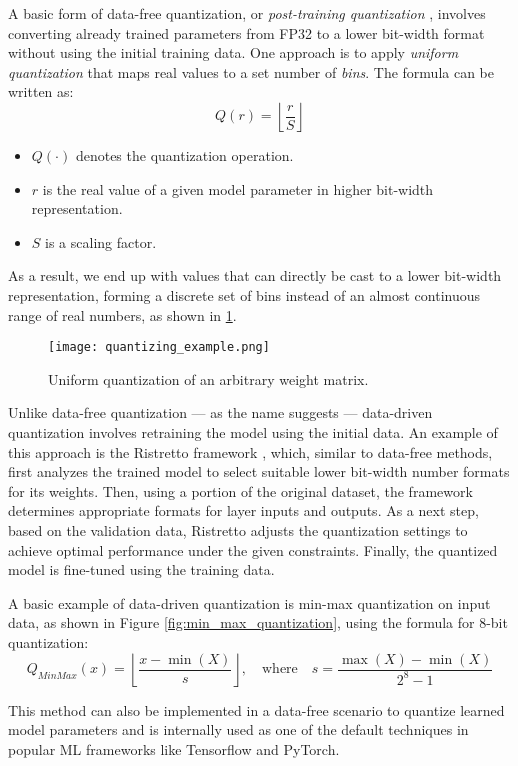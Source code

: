 A basic form of data-free quantization, or \textit{post-training quantization} \cite{jiang2021efficient},
involves converting already trained parameters from FP32 to a lower bit-width format
without using the initial training data. 
One approach is to apply \textit{uniform quantization} that maps real values to a set number
of \textit{bins}. The formula can be written as:
\[
Q(r) = \left\lfloor \frac{r}{S} \right\rfloor
\]

\newpage
\begin{itemize}
    \item $Q(\cdot)$ denotes the quantization operation.
    \item $r$ is the real value of a given model parameter in higher bit-width representation.
    \item $S$ is a scaling factor.
\end{itemize}
As a result, we end up with values that can directly be cast to a lower bit-width representation,
forming a discrete set of bins instead of an almost continuous range of real numbers,
as shown in \cref{fig:quantizing_example}.
\begin{figure}[b!]
  \centering
  \texttt{[image: quantizing\_example.png]}
  \caption{Uniform quantization of an arbitrary weight matrix.}
  \label{fig:quantizing_example}
\end{figure}

Unlike data-free quantization  —  as the name suggests — data-driven quantization involves retraining the model
using the initial data. An example of this approach is the Ristretto framework \cite{DBLP:journals/tnn/GyselPMG18}, which, similar to data-free methods, 
first analyzes the trained model to select suitable lower bit-width number formats for its weights.
Then, using a portion of the original dataset, the framework determines appropriate formats for layer inputs and outputs.
As a next step, based on the validation data, Ristretto adjusts the quantization settings to achieve optimal performance 
under the given constraints. Finally, the quantized model is fine-tuned using the training data.

A basic example of data-driven quantization is min-max quantization on input data, as shown in Figure \ref{fig:min_max_quantization},
using the formula for 8-bit quantization:
\[
Q_{\textit{MinMax}}(x) = \left\lfloor \frac{x - \min(X)}{s} \right\rfloor, \quad
\text{where} \quad s = \frac{\max(X) - \min(X)}{2^8 - 1}
\]

This method can also be implemented in a data-free scenario to quantize learned model parameters and is internally used as one of the
default techniques in popular ML frameworks like Tensorflow and PyTorch. 

